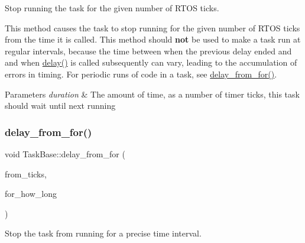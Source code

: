 Stop running the task for the given number of R\+T\+OS ticks. 

This method causes the task to stop running for the given number of R\+T\+OS ticks from the time it is called. This method should {\bfseries not} be used to make a task run at regular intervals, because the time between when the previous delay ended and and when {\ttfamily \mbox{\hyperlink{class_task_base_a06d9c962cc578a84a69ca637f6d5adef}{delay()}}} is called subsequently can vary, leading to the accumulation of errors in timing. For periodic runs of code in a task, see {\ttfamily \mbox{\hyperlink{class_task_base_adc48db72592a8b34ca1235e1d18604cc}{delay\+\_\+from\+\_\+for()}}}. 
\begin{DoxyParams}{Parameters}
{\em duration} & The amount of time, as a number of timer ticks, this task should wait until next running \\
\hline
\end{DoxyParams}
\mbox{\label{class_task_base_adc48db72592a8b34ca1235e1d18604cc}} 
\subsubsection{\texorpdfstring{delay\+\_\+from\+\_\+for()}{delay\_from\_for()}}
{\footnotesize\ttfamily void Task\+Base\+::delay\+\_\+from\+\_\+for (\begin{DoxyParamCaption}\item[{Tick\+Type\+\_\+t \&}]{from\+\_\+ticks,  }\item[{Tick\+Type\+\_\+t}]{for\+\_\+how\+\_\+long }\end{DoxyParamCaption})\hspace{0.3cm}{\ttfamily [inline]}}



Stop the task from running for a precise time interval. 

